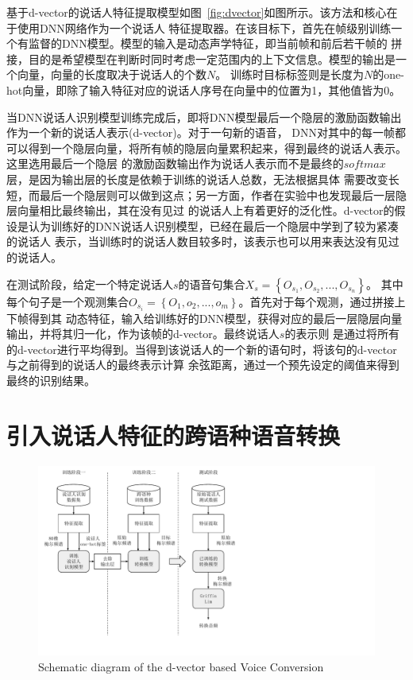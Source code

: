 基于d-vector的说话人特征提取模型如图~\ref{fig:dvector}如图所示。该方法和核心在于使用DNN网络作为一个说话人
特征提取器。在该目标下，首先在帧级别训练一个有监督的DNN模型。模型的输入是动态声学特征，即当前帧和前后若干帧的
拼接，目的是希望模型在判断时同时考虑一定范围内的上下文信息。模型的输出是一个向量，向量的长度取决于说话人的个数$N$。
训练时目标标签则是长度为$N$的one-hot向量，即除了输入特征对应的说话人序号在向量中的位置为1，其他值皆为0。

当DNN说话人识别模型训练完成后，即将DNN模型最后一个隐层的激励函数输出作为一个新的说话人表示(d-vector)。对于一句新的语音，
DNN对其中的每一帧都可以得到一个隐层向量，将所有帧的隐层向量累积起来，得到最终的说话人表示。这里选用最后一个隐层
的激励函数输出作为说话人表示而不是最终的$softmax$层，是因为输出层的长度是依赖于训练的说话人总数，无法根据具体
需要改变长短，而最后一个隐层则可以做到这点；另一方面，作者在实验中也发现最后一层隐层向量相比最终输出，其在没有见过
的说话人上有着更好的泛化性。d-vector的假设是认为训练好的DNN说话人识别模型，已经在最后一个隐层中学到了较为紧凑的说话人
表示，当训练时的说话人数目较多时，该表示也可以用来表达没有见过的说话人。

在测试阶段，给定一个特定说话人$s$的语音句集合$X_s = \left\{O_{s_{1}},O_{s_{2}},...,O_{s_{n}}\right\}$。
其中每个句子是一个观测集合$O_{s_{i}} = \left\{O_1,o_2,...,o_m\right\}$。首先对于每个观测，通过拼接上下帧得到其
动态特征，输入给训练好的DNN模型，获得对应的最后一层隐层向量输出，并将其归一化，作为该帧的d-vector。最终说话人$s$的表示则
是通过将所有的d-vector进行平均得到。当得到该说话人的一个新的语句时，将该句的d-vector与之前得到的说话人的最终表示计算
余弦距离，通过一个预先设定的阈值来得到最终的识别结果。

\section{引入说话人特征的跨语种语音转换}

\begin{figure}[!htp]
    \centering
    \includegraphics[width=12cm,trim=0 50 250 0,clip]{figure/5_proposedarch.pdf}
    {Schematic diagram of the d-vector based Voice Conversion}
    \label{fig:5proposedarch}
\end{figure}

